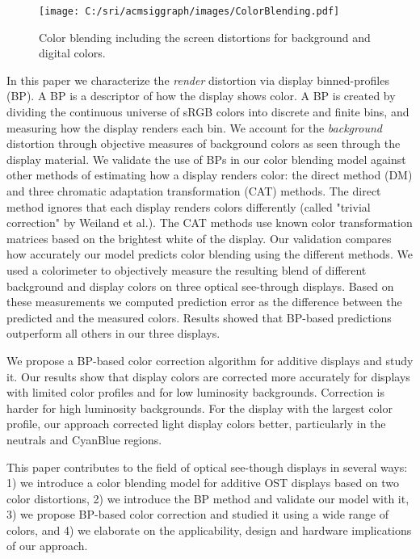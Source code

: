 \documentclass[annual]{acmsiggraph}
\begin{document}
\begin{figure}[ht]
  \centering
  \texttt{[image: C:/sri/acmsiggraph/images/ColorBlending.pdf]}
  \caption{Color blending including the screen distortions for background and digital colors.}
  \label{fig:Figure1}
\end{figure}

In this paper we characterize the \textit{render} distortion via display binned-profiles (BP). A BP is a descriptor of how the display shows color. A BP is created by dividing the continuous universe of sRGB colors into discrete and finite bins, and measuring how the display renders each bin. We account for the \textit{background} distortion through objective measures of background colors as seen through the display material. We validate the use of BPs in our color blending model against other methods of estimating how a display renders color: the direct method (DM) and three chromatic adaptation transformation (CAT) methods. The direct method ignores that each display renders colors differently (called "trivial correction" by Weiland et al.). The CAT methods use known color transformation matrices based on the brightest white of the display. Our validation compares how accurately our model predicts color blending using the different methods. We used a colorimeter to objectively measure the resulting blend of different background and display colors on three optical see-through displays. Based on these measurements we computed prediction error as the difference between the predicted and the measured colors. Results showed that BP-based predictions outperform all others in our three displays.

We propose a BP-based color correction algorithm for additive displays and study it. Our results show that display colors are corrected more accurately for displays with limited color profiles and for low luminosity backgrounds. Correction is harder for high luminosity backgrounds. For the display with the largest color profile, our approach corrected light display colors better, particularly in the neutrals and CyanBlue regions.

This paper contributes to the field of optical see-though displays in several ways: 1) we introduce a color blending model for additive OST displays based on two color distortions, 2) we introduce the BP method and validate our model with it, 3) we propose BP-based color correction and studied it using a wide range of colors, and 4) we elaborate on the applicability, design and hardware implications of our approach.
\end{document}
